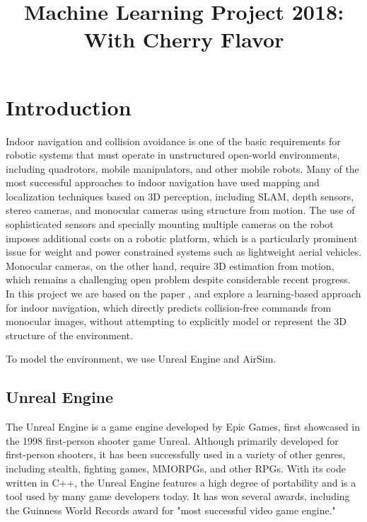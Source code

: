 \documentclass{article}
\begin{document}
\title{Machine Learning Project 2018: With Cherry Flavor}
\maketitle

\small

\section{Introduction}

Indoor  navigation  and  collision  avoidance  is  one  of  the
basic  requirements  for  robotic  systems  that  must  operate  in
unstructured  open-world  environments,  including  quadrotors,
mobile  manipulators,  and  other  mobile  robots.  Many  of  the
most successful approaches to indoor navigation have used
mapping  and  localization  techniques  based  on  3D  
perception,  including  SLAM,  depth  sensors,  stereo  cameras,  
and  monocular  cameras  using  structure  from  motion. 
The use of sophisticated sensors and specially mounting multiple 
cameras on the robot imposes additional costs on
a  robotic  platform,  which  is  a  particularly  prominent  issue
for weight and power constrained systems such as lightweight
aerial vehicles. Monocular cameras, on the other hand, require
3D  estimation  from  motion,  which  remains  a  challenging
open  problem  despite  considerable  recent  progress.
In this project we are based on the paper \cite{cad2rl}, 
and explore a learning-based approach for indoor
navigation,  which  directly  predicts  collision-free
commands from monocular images, without attempting to 
explicitly  model  or  represent  the  3D  structure  
of  the  environment.

To model the environment, we use Unreal Engine and AirSim.

\subsection{Unreal Engine}

The Unreal Engine is a game engine developed by Epic Games, 
first showcased in the 1998 first-person shooter game Unreal. 
Although primarily developed for first-person shooters, it has 
been successfully used in a variety of other genres, including 
stealth, fighting games, MMORPGs, and other RPGs. With its code 
written in C++, the Unreal Engine features a high degree of portability 
and is a tool used by many game developers today. It has won several 
awards, including the Guinness World Records award 
for "most successful video game engine."
\end{document}
